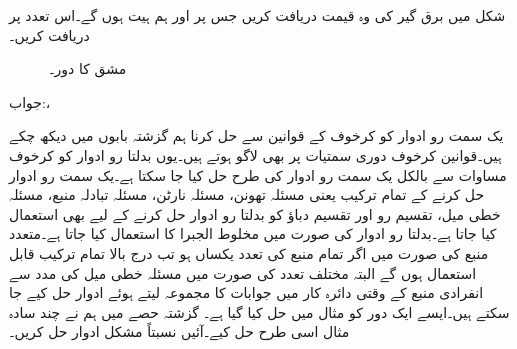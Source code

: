 شکل  میں برق گیر کی وہ قیمت دریافت کریں جس پر  اور  ہم ہیت ہوں گے۔اس تعدد پر  دریافت کریں۔
\begin{figure}
\centering
{}
\caption{مشق  کا دور۔}
\label{شکل_بدلتا_دو_پرزے_متوازی_ب}
\end{figure}

جواب:، 

یک سمت رو ادوار کو کرخوف کے قوانین سے حل کرنا ہم گزشتہ بابوں میں دیکھ چکے ہیں۔قوانین کرخوف دوری سمتیات پر بھی لاگو ہوتے ہیں۔یوں بدلتا رو ادوار کو کرخوف مساوات سے بالکل یک سمت رو ادوار کی طرح حل کیا جا سکتا ہے۔یک سمت رو ادوار حل کرنے کے تمام ترکیب یعنی مسئلہ تھونن، مسئلہ نارٹن، مسئلہ تبادلہ منبع، مسئلہ خطی میل، تقسیم رو اور تقسیم دباؤ کو بدلتا رو ادوار حل کرنے کے لیے بھی استعمال کیا جاتا ہے۔بدلتا رو ادوار کی صورت میں مخلوط الجبرا کا استعمال کیا جاتا ہے۔متعدد منبع کی صورت میں اگر تمام منبع کی تعدد یکساں ہو تب درج بالا تمام ترکیب قابل استعمال ہوں گے البتہ مختلف تعدد کی صورت میں مسئلہ خطی میل کی مدد سے انفرادی منبع کے وقتی دائرہ کار میں جوابات کا مجموعہ لیتے ہوئے ادوار حل کیے جا سکتے ہیں۔ایسے ایک دور کو مثال  میں حل کیا گیا ہے۔ گزشتہ حصے میں ہم نے چند سادہ مثال اسی طرح حل کیے۔آئیں نسبتاً مشکل ادوار حل کریں۔


